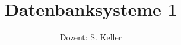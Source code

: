 \documentclass{scrartcl}
\title{Datenbanksysteme 1}
\subtitle{Dozent: S. Keller}
\begin{document}
\begin{titlepage}
    \maketitle
    \thispagestyle{empty}
\end{titlepage}
\newpage

\tableofcontents
\newpage



\end{document}
